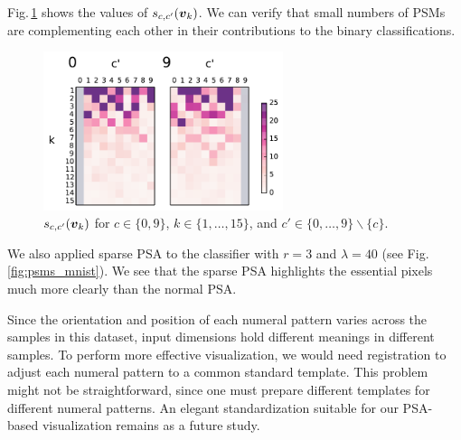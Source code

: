 Fig.\,\ref{fig:local_s_mnist} shows the values of $s_{c,c'}(\mbox{\boldmath $v$}_{k})$.
We can verify that small numbers of PSMs are complementing each other
in their contributions to the binary classifications.
\begin{figure}[htb]
 \centering
 \includegraphics[width=7cm]{./fig/fig5b.pdf}
 \caption{$s_{c, c'}(\mbox{\boldmath $v$}_{k})$ for $c \in \{0, 9\}$, $k \in
 \{1, \dots, 15\}$, and $c' \in \{0, \dots, 9\} \backslash \{c\}$.}
 \label{fig:local_s_mnist}
\end{figure}

We also applied sparse PSA to the classifier with $r = 3$ and $\lambda =
40$ (see Fig.\,\ref{fig:psms_mnist}).
We see that the sparse PSA highlights the essential pixels much more clearly
than the normal PSA.

Since the orientation and position of each numeral pattern
varies across the samples in this dataset,
input dimensions hold different meanings in different samples.
%
To perform more effective visualization,
we would need registration to adjust each numeral pattern
to a common standard template.
%
This problem might not be straightforward, since one must prepare
different templates for different numeral patterns.
An elegant standardization suitable for our PSA-based visualization
remains as a future study.

